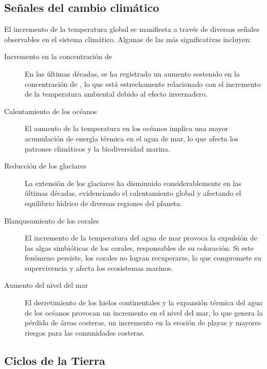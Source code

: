 \subsection{Se\~nales del cambio clim\'atico}\label{senial}

El incremento de la temperatura global se manifiesta a trav\'es de diversas se\~nales observables en el sistema clim\'atico. Algunas de las m\'as significativas incluyen:

\begin{description}
    \item[Incremento en la concentraci\'on de ] En las \'ultimas d\'ecadas, se ha registrado un aumento sostenido en la concentraci\'on de , lo que est\'a estrechamente relacionado con el incremento de la temperatura ambiental debido al efecto invernadero.
    
    \item[Calentamiento de los oc\'eanos] El aumento de la temperatura en los oc\'eanos implica una mayor acumulaci\'on de energ\'{\i}a t\'ermica en el agua de mar, lo que afecta los patrones clim\'aticos y la biodiversidad marina.
    
    \item[Reducci\'on de los glaciares] La extensi\'on de los glaciares ha disminuido considerablemente en las \'ultimas d\'ecadas, evidenciando el calentamiento global y afectando el equilibrio h\'{\i}drico de diversas regiones del planeta.
    
    \item[Blanqueamiento de los corales] El incremento de la temperatura del agua de mar provoca la expulsi\'on de las algas simbi\'oticas de los corales, responsables de su coloraci\'on. Si este fen\'omeno persiste, los corales no logran recuperarse, lo que compromete su supervivencia y afecta los ecosistemas marinos.
    
    \item[Aumento del nivel del mar] El derretimiento de los hielos continentales y la expansi\'on t\'ermica del agua de los oc\'eanos provocan un incremento en el nivel del mar, lo que genera la p\'erdida de \'areas costeras, un incremento en la erosi\'on de playas y mayores riesgos para las comunidades costeras.
\end{description}

\subsection{Ciclos de la Tierra}\label{ctierra}

